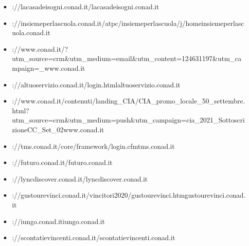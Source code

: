 \documentclass{article}
\begin{document}
\begin{itemize}
        
        
        \item \hrefhttp://lacasadeisogni.conad.it/lacasadeisogni.conad.it
    
        
        
        \item \hrefhttps://insiemeperlascuola.conad.it/atpc/insiemeperlascuola/j/homeinsiemeperlascuola.conad.it
    
        
        
        \item \hrefhttps://www.conad.it/?utm\_source=crm\&utm\_medium=email\&utm\_content=124631197\&utm\_campaign=\_www.conad.it
    
        
        
        \item \hrefhttps://altuoservizio.conad.it/login.htmlaltuoservizio.conad.it
    
        
        
        \item \hrefhttps://www.conad.it/contenuti/landing\_CIA/CIA\_promo\_locale\_50\_settembre.html?utm\_source=crm\&utm\_medium=push\&utm\_campaign=cia\_2021\_SottoscrizioneCC\_Set\_02www.conad.it
    
        
        
        \item \hrefhttps://tms.conad.it/core/framework/login.cfmtms.conad.it
    
        
        
        \item \hrefhttps://futuro.conad.it/futuro.conad.it
    
        
        
        \item \hrefhttps://lyncdiscover.conad.it/lyncdiscover.conad.it
    
        
        
        \item \hrefhttp://gustourevinci.conad.it/vincitori2020/gustourevinci.htmgustourevinci.conad.it
    
        
        
        \item \hrefhttp://iungo.conad.itiungo.conad.it
    
        
        
        \item \hrefhttps://scontatievincenti.conad.it/scontatievincenti.conad.it
    

\end{itemize}
\end{document}
